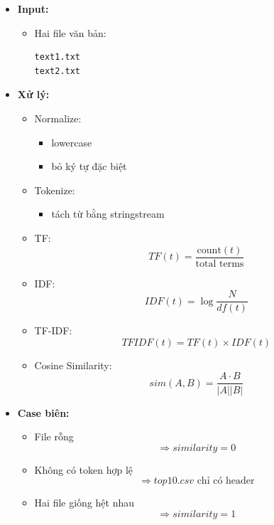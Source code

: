 \begin{itemize}

    \item \textbf{Input:}

    \begin{itemize}
        \item Hai file văn bản:
\begin{lstlisting}
text1.txt
text2.txt
\end{lstlisting}
    \end{itemize}

    \item \textbf{Xử lý:}

    \begin{itemize}

        \item Normalize:
        \begin{itemize}
            \item lowercase
            \item bỏ ký tự đặc biệt
        \end{itemize}

        \item Tokenize:
        \begin{itemize}
            \item tách từ bằng stringstream
        \end{itemize}

        \item TF:
        \[
            TF(t)=\frac{\text{count}(t)}{\text{total terms}}
        \]

        \item IDF:
        \[
            IDF(t)=\log \frac{N}{df(t)}
        \]

        \item TF-IDF:
        \[
            TFIDF(t)=TF(t)\times IDF(t)
        \]

        \item Cosine Similarity:
        \[
            sim(A,B)=
            \frac{A\cdot B}
            {|A||B|}
        \]
    \end{itemize}

    \item \textbf{Case biên:}

    \begin{itemize}
        \item File rỗng
        \[
            \Rightarrow similarity=0
        \]

        \item Không có token hợp lệ
        \[
            \Rightarrow top10.csv \text{ chỉ có header}
        \]

        \item Hai file giống hệt nhau
        \[
            \Rightarrow similarity=1
        \]
    \end{itemize}

\end{itemize}

